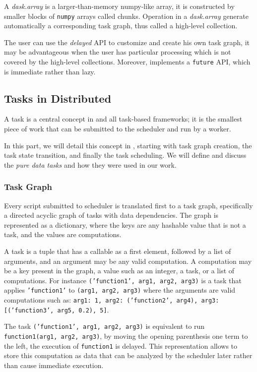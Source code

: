 A \textit{dask.array}\cite{rocklin_dask_2015} is a larger-than-memory numpy-like array, it is constructed by smaller blocks of \texttt{numpy} arrays called chunks. Operation in a \textit{dask.array} generate automatically a corresponding task graph, thus called a high-level collection. 

The user can use the \textit{delayed} API to customize and create his own task graph, it may be advantageous when the user has particular processing which is not covered by the high-level collections. 
Moreover, \dask implements a \texttt{future} API, which is immediate rather than lazy.



\subsection{Tasks in \dask Distributed}
A task is a central concept in \dask and all task-based frameworks; it is the smallest piece of work that can be submitted to the scheduler and run by a worker. 

In this part, we will detail this concept in \dask, starting with task graph creation, the task state transition, and finally the task scheduling. We will define and discuss the \textit{pure data tasks} and how they were used in our work.



\subsubsection{Task Graph}\label{sec:taskgraph}

Every script submitted to \dask scheduler is translated first to a task graph, specifically a directed acyclic graph of tasks with data dependencies. The graph is represented as a dictionary, where the keys are any hashable value that is not a task, and the values are computations. 

A task is a tuple that has a callable as a first element, followed by a list of arguments, and an argument may be any valid computation. A computation may be a key present in the graph, a value such as an integer, a task, or a list of computations. For instance \texttt{('function1', arg1, arg2, arg3)} is a task that applies \texttt{'function1'} to \texttt{(arg1, arg2, arg3)} where the arguments are valid computations such as: \texttt{{arg1: 1, arg2: ('function2', arg4), arg3: [('function3', arg5, 0.2), 5]}}.

The task \texttt{('function1', arg1, arg2, arg3)} is equivalent to run \texttt{function1(arg1, arg2, arg3)}, by moving the opening parenthesis one term to the left, the execution of \texttt{function1} is delayed. This representation allows \dask to store this computation as data that can be analyzed by the scheduler later rather than cause immediate execution.   


